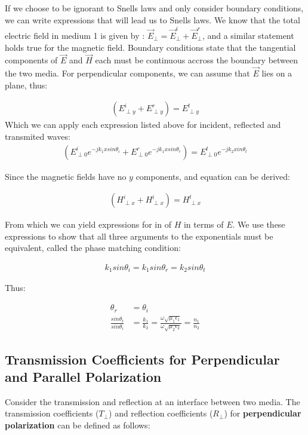 \documentclass{book}
\begin{document}
If we choose to be ignorant to Snells laws and only consider boundary conditions, we can write expressions that will lead us to Snells laws. We know that the total electric field in medium 1 is given by : $\vec{E}_\perp = \vec{E}_\perp ^i + \vec{E}_\perp^r$, and a similar statement holds true for the magnetic field.
Boundary conditions state that the tangential components of $\vec{E}$ and $\vec{H}$ each must be continuous accross the boundary between the two media. For perpendicular components, we can assume that $\vec{E}$ lies on a plane, thus:

\begin{align*}
	(E^i_{\perp y} + E^r_{\perp y}) = E^t_{\perp y} 
\end{align*}
Which we can apply each expression listed above for incident, reflected and transmited waves:
\begin{align*}
	(E^i_{\perp 0}e^{-jk_1xsin\theta_i} + E^r_{\perp 0} e^{-jk_1 xsin\theta_r}) = E^t_{\perp 0} e^{-jk_2 xin\theta_t} 
\end{align*}

Since the magnetic fields have no $y$ components, and equation can be derived:

\begin{align*}
	(H^i_{\perp x}+ H^i_{\perp x} ) = H^t_{\perp x} 
\end{align*}

From which we can yield expressions for in of $H$ in terms of $E$. We use these expressions to show that all three arguments to the exponentials must be equivalent, called the phase matching condition:

\begin{align*}
	k_1 sin\theta_i = k_1 sin\theta_r = k_2 sin\theta_t
\end{align*}

Thus:

\begin{align*}
	\theta_r &= \theta_i \\
	\frac{sin \theta_t}{sin \theta_i} &= \frac{k_1}{k_2} = \frac{\omega \sqrt{\mu_1 \epsilon_1}}{\omega \sqrt{\mu_2 \epsilon_2}} = \frac{n_1}{n_2}
\end{align*}
\subsection{Transmission Coefficients for Perpendicular and Parallel Polarization}

Consider the transmission and reflection at an interface between two media. The transmission coefficients ($T_{\perp}$) and reflection coefficients ($R_{\perp}$) for \textbf{perpendicular polarization} can be defined as follows:
\end{document}
